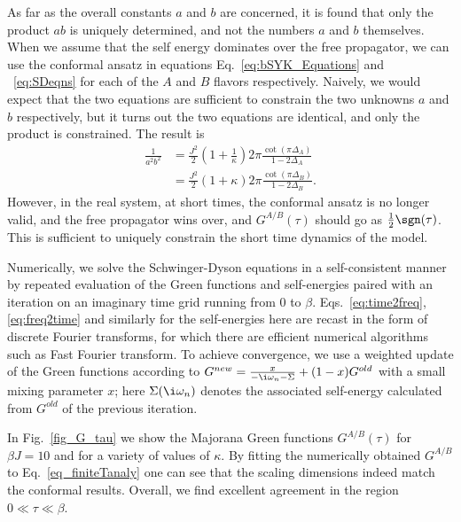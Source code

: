 As far as the overall constants $a$ and $b$ are concerned, it is found that only the product $ab$ is uniquely determined, and not the numbers $a$ and $b$ themselves. When we assume that the self energy dominates over the free propagator, we can use the conformal ansatz in equations Eq.~\eqref{eq:bSYK_Equations} and ~\eqref{eq:SDeqns} for each of the $A$ and $B$ flavors respectively. Naively, we would expect that the two equations are sufficient to constrain the two unknowns $a$ and $b$ respectively, but it turns out the two equations are identical, and only the product is constrained. The result is 
\begin{align}
	\frac{1}{a^2 b^2} &= \frac{J^2}{2}\left(1+\frac{1}{\kappa}\right) 2\pi \frac{\cot(\pi\Delta_A)}{1-2\Delta_A} \\
	&= \frac{J^2}{2}\left(1+\kappa\right) 2\pi \frac{\cot(\pi\Delta_B)}{1-2\Delta_B} .
\end{align} 
However, in the real system, at short times, the conformal ansatz is no longer valid, and the free propagator wins over, and $G^{A/B}(\tau)$ should go as $\frac{1}{2}\sgn(\tau)$. This is sufficient to uniquely constrain the short time dynamics of the model. 

Numerically, we solve the Schwinger-Dyson equations in a self-consistent manner by repeated evaluation of the Green functions and self-energies paired with an iteration on an imaginary time grid running from $0$ to $\beta$. Eqs.~\eqref{eq:time2freq},
\eqref{eq:freq2time} and similarly for the self-energies here are recast in the form of discrete Fourier transforms,
for which there are efficient numerical algorithms such as Fast Fourier transform.
To achieve convergence, we use a weighted update of the Green functions according to $G^{new} = \frac{x}{-\i\omega_n - \Sigma} + (1-x)G^{old}$ with a small mixing parameter $x$; here $\Sigma(\i\omega_n)$ denotes the associated self-energy calculated from $G^{old}$ of the previous iteration.

In Fig.~\ref{fig_G_tau} we show the Majorana Green functions $G^{A/B}(\tau)$ for $\beta J=10$ and for a variety of values of $\kappa$.
By fitting the numerically obtained $G^{A/B}$ to Eq.~\eqref{eq_finiteTanaly} one can see that the scaling dimensions indeed match the conformal results. Overall,
we find excellent agreement in the region $0\ll\tau\ll\beta$.


